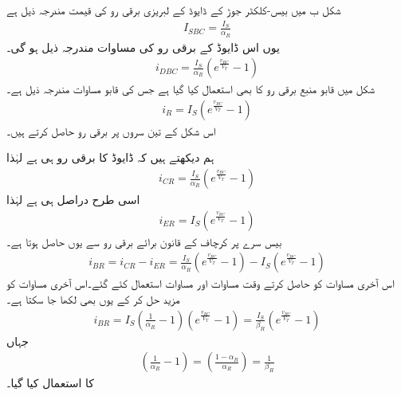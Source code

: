 شکل  ب میں بیس-کلکٹر جوڑ کے ڈایوڈ کے لبریزی برقی رو کی قیمت مندرجہ ذیل ہے
\begin{align}
I_{SBC}=\frac{I_S}{\alpha_R}
\end{align}
یوں اس ڈایوڈ کے برقی رو کی مساوات مندرجہ ذیل ہو گی۔
\begin{align}
i_{DBC}=\frac{I_S}{\alpha_R} \left(e^{\frac{v_{BC}}{V_T}}-1 \right )
\end{align}
شکل میں قابو منبع برقی رو   کا بھی استعمال کیا گیا ہے جس کی قابو مساوات مندرجہ ذیل ہے۔
\begin{align}
i_R = I_S \left (e^{\frac{v_{BC}}{V_T}}-1 \right )
\end{align}
اس شکل کے تین سروں پر برقی رو حاصل کرتے ہیں۔

ہم دیکھتے ہیں کہ ڈایوڈ کا برقی رو ہی  ہے لہٰذا
\begin{align} \label{مساوات_ٹرانزسٹر_کلکٹر _الٹی_رو}
i_{CR}=\frac{I_S}{\alpha_R} \left (e^{\frac{v_{BC}}{V_T}}-1 \right )
\end{align}
اسی طرح   دراصل  ہی ہے لہٰذا
\begin{align} \label{مساوات_ٹرانزسٹر_مخارج_الٹی_رو}
i_{ER}=I_S \left (e^{\frac{v_{BC}}{V_T}}-1 \right )
\end{align}
بیس سرے پر کرچاف کے قانون برائے برقی رو سے  یوں حاصل ہوتا ہے۔
\begin{align} \label{مساوات_ٹرانزسٹر_قابو_الٹی_رو_الف}
i_{BR}=i_{CR}-i_{ER}=\frac{I_S}{\alpha_R} \left (e^{\frac{v_{BC}}{V_T}}-1 \right )-I_S \left (e^{\frac{v_{BC}}{V_T}}-1 \right )
\end{align}
اس آخری مساوات کو حاصل کرتے وقت مساوات   اور مساوات   استعمال کئے گئے۔اس آخری مساوات کو مزید حل کر کے یوں بھی لکھا جا سکتا ہے۔
\begin{align}
i_{BR}=I_S \left (\frac{1}{\alpha_R}-1 \right ) \left (e^{\frac{v_{BC}}{V_T}}-1 \right )=\frac{I_S}{\beta_R} \left (e^{\frac{v_{BC}}{V_T}}-1 \right )
\end{align}
جہاں
\begin{align}
\left (\frac{1}{\alpha_R}-1 \right )=\left (\frac{1-\alpha_R}{\alpha_R} \right )=\frac{1}{\beta_R}
\end{align}
کا استعمال کیا گیا۔

